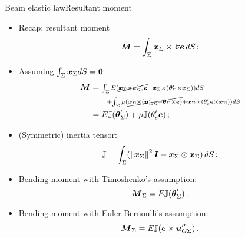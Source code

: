 \begin{frame}{Beam elastic law}{Resultant moment}

\begin{itemize}
\item Recap: resultant moment
\begin{displaymath}
\Mres=\int_\Sigma\xv_\Sigma\times\stress\ev\,\id S\,;
\end{displaymath}
\item Assuming $\int_\Sigma{\boldsymbol{x}}_\Sigma d S={\bf 0}$:
\begin{displaymath}
\begin{split}
{\boldsymbol{M}} &= \;\scriptstyle \int_\Sigma E(\cancel{{\boldsymbol{x}}_\Sigma\times u_{Ge}'{\boldsymbol{e}}}+{\boldsymbol{x}}_\Sigma\times({\boldsymbol{\theta}}_\Sigma'\times{\boldsymbol{x}}_\Sigma))d S \\
&\quad\quad\scriptstyle+\int_\Sigma\mu(\cancel{{\boldsymbol{x}}_\Sigma\times({\boldsymbol{u}}_{G\Sigma}'-{\boldsymbol{\theta}}_\Sigma\times{\boldsymbol{e}})}+{\boldsymbol{x}}_\Sigma\times(\theta_e'{\boldsymbol{e}}\times{\boldsymbol{x}}_\Sigma))d S \\
&=E{\mathbb{J}}({\boldsymbol{\theta}}_\Sigma')+\mu{\mathbb{J}}(\theta_e'{\boldsymbol{e}})\,;
\end{split}
\end{displaymath}
\item (Symmetric) inertia tensor:
\begin{displaymath}
{\mathbb{J}}=\int_\Sigma(\left\|{\boldsymbol{x}}_\Sigma\right\|^2{\boldsymbol I}-{\boldsymbol{x}}_\Sigma\otimes{\boldsymbol{x}}_\Sigma)\,d S\,;
\end{displaymath}
\end{itemize}

\begin{overprint}

\begin{itemize}
\item Bending moment with Timoshenko's assumption:
\begin{displaymath}
{\boldsymbol{M}}_\Sigma=E{\mathbb{J}}({\boldsymbol{\theta}}_\Sigma')\,.
\end{displaymath}
\end{itemize}

\begin{itemize}
\item Bending moment with Euler-Bernoulli's assumption:
\begin{displaymath}
{\boldsymbol{M}}_\Sigma=E{\mathbb{J}}({\boldsymbol{e}}\times{\boldsymbol{u}}_{G\Sigma}'')\,.
\end{displaymath}
\end{itemize}

\end{overprint}

\end{frame}

